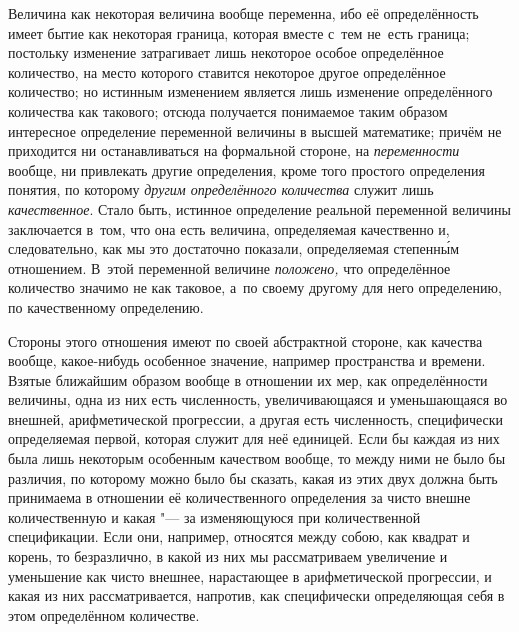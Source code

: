 Величина как некоторая величина вообще переменна, ибо её определённость имеет
бытие как некоторая граница, которая вместе с~тем не~есть граница; постольку
изменение затрагивает лишь некоторое особое определённое количество, на место
которого ставится некоторое другое определённое количество; но истинным
изменением является лишь изменение определённого количества как такового;
отсюда получается понимаемое таким образом интересное определение переменной
величины в высшей математике; причём не приходится ни останавливаться на
формальной стороне, на {\em переменности} вообще, ни привлекать другие
определения, кроме того простого определения понятия, по которому
{\em другим определённого количества} служит лишь {\em качественное}. Стало
быть, истинное определение реальной переменной величины заключается в~том, что
она есть величина, определяемая качественно и, следовательно, как мы это
достаточно показали, определяемая степенн\'{ы}м отношением. В~этой переменной
величине {\em положено,} что определённое количество значимо не как таковое,
а~по своему другому для него определению, по качественному определению.

Стороны этого отношения имеют по своей абстрактной стороне, как качества
вообще, какое-нибудь особенное значение, например пространства и времени.
Взятые ближайшим образом вообще в отношении их мер, как определённости
величины, одна из них есть численность, увеличивающаяся и уменьшающаяся во
внешней, арифметической прогрессии, а другая есть численность, специфически
определяемая первой, которая служит для неё единицей. Если бы каждая из них
была лишь некоторым особенным качеством вообще, то между ними не было бы
различия, по которому можно было бы сказать, какая из этих двух должна быть
принимаема в отношении её количественного определения за чисто внешне
количественную и какая "--- за изменяющуюся при количественной спецификации.
Если они, например, относятся между собою, как квадрат и корень, то
безразлично, в какой из них мы рассматриваем увеличение и уменьшение как чисто
внешнее, нарастающее в арифметической прогрессии, и какая из них
рассматривается, напротив, как специфически определяющая себя в этом
определённом количестве.

